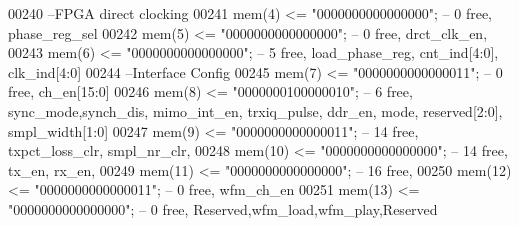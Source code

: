 \begin{DoxyCode}
00240 \textcolor{keyword}{            --FPGA direct clocking}
00241             \textcolor{vhdlchar}{mem}\textcolor{vhdlchar}{(}\textcolor{vhdllogic}{}\textcolor{vhdllogic}{4}\textcolor{vhdlchar}{)}  \textcolor{vhdlchar}{<=} \textcolor{vhdllogic}{"0000000000000000"};\textcolor{keyword}{ --  0 free, phase\_reg\_sel}
00242             \textcolor{vhdlchar}{mem}\textcolor{vhdlchar}{(}\textcolor{vhdllogic}{}\textcolor{vhdllogic}{5}\textcolor{vhdlchar}{)}  \textcolor{vhdlchar}{<=} \textcolor{vhdllogic}{"0000000000000000"};\textcolor{keyword}{ --  0 free, drct\_clk\_en, }
00243             \textcolor{vhdlchar}{mem}\textcolor{vhdlchar}{(}\textcolor{vhdllogic}{}\textcolor{vhdllogic}{6}\textcolor{vhdlchar}{)}  \textcolor{vhdlchar}{<=} \textcolor{vhdllogic}{"0000000000000000"};\textcolor{keyword}{ --  5 free, load\_phase\_reg, cnt\_ind[4:0], clk\_ind[4:0]}
00244 \textcolor{keyword}{            --Interface Config}
00245             \textcolor{vhdlchar}{mem}\textcolor{vhdlchar}{(}\textcolor{vhdllogic}{}\textcolor{vhdllogic}{7}\textcolor{vhdlchar}{)}  \textcolor{vhdlchar}{<=} \textcolor{vhdllogic}{"0000000000000011"};\textcolor{keyword}{ --  0 free, ch\_en[15:0]}
00246             \textcolor{vhdlchar}{mem}\textcolor{vhdlchar}{(}\textcolor{vhdllogic}{}\textcolor{vhdllogic}{8}\textcolor{vhdlchar}{)}  \textcolor{vhdlchar}{<=} \textcolor{vhdllogic}{"0000000100000010"};\textcolor{keyword}{ --  6 free, sync\_mode,synch\_dis, mimo\_int\_en, trxiq\_pulse,
       ddr\_en, mode, reserved[2:0], smpl\_width[1:0]}
00247             \textcolor{vhdlchar}{mem}\textcolor{vhdlchar}{(}\textcolor{vhdllogic}{}\textcolor{vhdllogic}{9}\textcolor{vhdlchar}{)}  \textcolor{vhdlchar}{<=} \textcolor{vhdllogic}{"0000000000000011"};\textcolor{keyword}{ -- 14 free, txpct\_loss\_clr, smpl\_nr\_clr,         }
00248             \textcolor{vhdlchar}{mem}\textcolor{vhdlchar}{(}\textcolor{vhdllogic}{}\textcolor{vhdllogic}{10}\textcolor{vhdlchar}{)} \textcolor{vhdlchar}{<=} \textcolor{vhdllogic}{"0000000000000000"};\textcolor{keyword}{ -- 14 free, tx\_en, rx\_en,}
00249             \textcolor{vhdlchar}{mem}\textcolor{vhdlchar}{(}\textcolor{vhdllogic}{}\textcolor{vhdllogic}{11}\textcolor{vhdlchar}{)} \textcolor{vhdlchar}{<=} \textcolor{vhdllogic}{"0000000000000000"};\textcolor{keyword}{ -- 16 free, }
00250             \textcolor{vhdlchar}{mem}\textcolor{vhdlchar}{(}\textcolor{vhdllogic}{}\textcolor{vhdllogic}{12}\textcolor{vhdlchar}{)} \textcolor{vhdlchar}{<=} \textcolor{vhdllogic}{"0000000000000011"};\textcolor{keyword}{ --  0 free, wfm\_ch\_en}
00251             \textcolor{vhdlchar}{mem}\textcolor{vhdlchar}{(}\textcolor{vhdllogic}{}\textcolor{vhdllogic}{13}\textcolor{vhdlchar}{)} \textcolor{vhdlchar}{<=} \textcolor{vhdllogic}{"0000000000000000"};\textcolor{keyword}{ --  0 free, Reserved,wfm\_load,wfm\_play,Reserved}

\end{DoxyCode}
